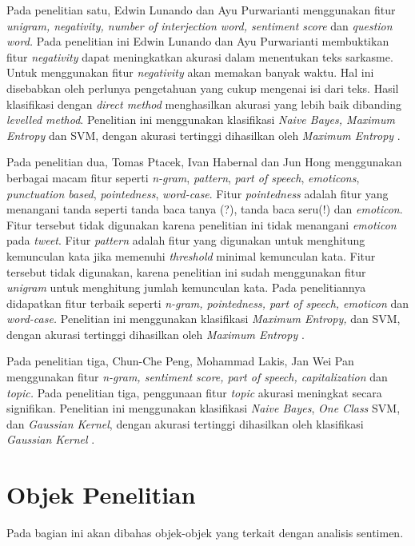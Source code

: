 Pada penelitian satu, Edwin Lunando dan Ayu Purwarianti menggunakan 
fitur \textit{unigram, negativity, number of interjection word, sentiment score} dan 
\textit{question word. }Pada penelitian ini Edwin Lunando dan Ayu 
Purwarianti membuktikan fitur \textit{negativity }dapat meningkatkan 
akurasi dalam menentukan teks sarkasme. Untuk menggunakan fitur \textit{
negativity} akan memakan banyak waktu. Hal ini disebabkan oleh perlunya 
pengetahuan yang cukup mengenai isi dari teks. Hasil klasifikasi dengan 
\textit{direct method} menghasilkan akurasi yang lebih baik dibanding 
\textit{levelled method}. Penelitian ini menggunakan klasifikasi 
\textit{Naive Bayes, Maximum Entropy }dan SVM, dengan akurasi 
tertinggi dihasilkan oleh \textit{Maximum Entropy }\cite{5}.

Pada penelitian dua, Tomas Ptacek, Ivan Habernal dan Jun Hong menggunakan berbagai macam fitur seperti \textit{n-gram}, \textit{pattern}, \textit{part of speech}, \textit{emoticons}, \textit{punctuation based}, \textit{pointedness}, \textit{word-case}. Fitur \textit{pointedness} adalah fitur yang menangani tanda seperti tanda baca tanya (?), tanda baca seru(!) dan \textit{emoticon}. Fitur tersebut tidak digunakan karena penelitian ini tidak menangani \textit{emoticon} pada \textit{tweet}. Fitur \textit{pattern} adalah fitur yang digunakan untuk menghitung kemunculan kata jika memenuhi \textit{threshold} minimal kemunculan kata. Fitur tersebut tidak digunakan, karena penelitian ini sudah menggunakan fitur \textit{unigram} untuk menghitung jumlah kemunculan kata. Pada penelitiannya didapatkan fitur terbaik seperti \textit{n-gram, pointedness, part of speech, emoticon }dan \textit{word-case.} Penelitian ini menggunakan klasifikasi \textit{Maximum Entropy, }dan SVM, dengan akurasi tertinggi dihasilkan oleh \textit{Maximum Entropy} \cite{3}.

Pada penelitian tiga, Chun-Che Peng, Mohammad Lakis, Jan Wei Pan 
menggunakan fitur \textit{n-gram, sentiment score, part of speech, 
capitalization} dan \textit{topic.} Pada penelitian tiga, penggunaan 
fitur \textit{topic} akurasi meningkat secara signifikan. Penelitian 
ini menggunakan klasifikasi \textit{Naive Bayes}, \textit{One Class} SVM, dan \textit{Gaussian Kernel}, dengan akurasi tertinggi 
dihasilkan oleh klasifikasi \textit{Gaussian Kernel }\cite{4}.
\section{Objek Penelitian}
Pada bagian ini akan dibahas objek-objek yang terkait dengan analisis 
sentimen.
